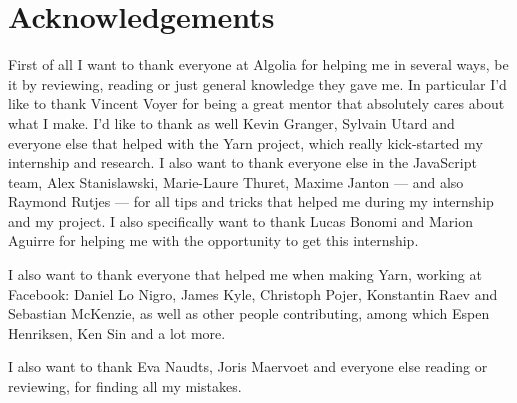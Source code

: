 
\chapter{Acknowledgements}%
\label{chp:acknowledgements}

First of all I want to thank everyone at Algolia for helping me in several ways, be it by reviewing, reading or just general knowledge they gave me. In particular I'd like to thank Vincent Voyer for being a great mentor that absolutely cares about what I make. I'd like to thank as well Kevin Granger, Sylvain Utard and everyone else that helped with the Yarn project, which really kick-started my internship and research. I also want to thank everyone else in the JavaScript team, Alex Stanislawski, Marie-Laure Thuret, Maxime Janton --- and also Raymond Rutjes --- for all tips and tricks that helped me during my internship and my project. I also specifically want to thank Lucas Bonomi and Marion Aguirre for helping me with the opportunity to get this internship.

I also want to thank everyone that helped me when making Yarn, working at Facebook: Daniel Lo Nigro, James Kyle, Christoph Pojer, Konstantin Raev and Sebastian McKenzie, as well as other people contributing, among which Espen Henriksen, Ken Sin and a lot more.

I also want to thank Eva Naudts, Joris Maervoet and everyone else reading or reviewing, for finding all my mistakes.
